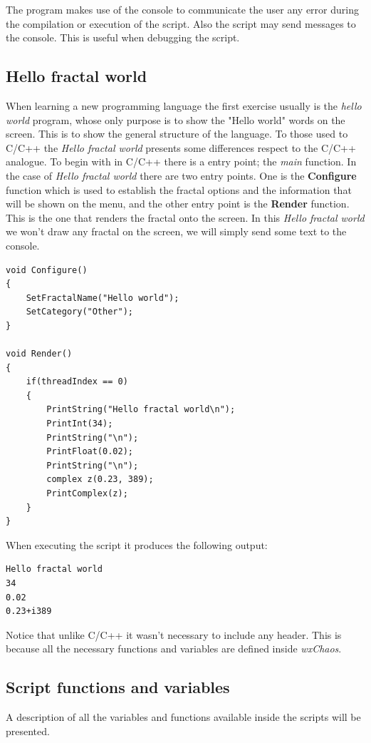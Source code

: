 \documentclass[oneside]{book}
\begin{document}
The program makes use of the console to communicate the user any error during the compilation or execution of the script. Also the script may send messages to the console. This is useful when debugging the script.

\subsection{Hello fractal world}
When learning a new programming language the first exercise usually is the \textit{hello world} program, whose only purpose is to show the "Hello world" words on the screen. This is to show the general structure of the language. To those used to C/C++ the \textit{Hello fractal world} presents some differences respect to the C/C++ analogue. To begin with in C/C++ there is a entry point; the \textit{main} function. In the case of \textit{Hello fractal world} there are two entry points. One is the \textbf{Configure} function which is used to establish the fractal options and the information that will be shown on the menu, and the other entry point is the \textbf{Render} function. This is the one that renders the fractal onto the screen. In this \textit{Hello fractal world} we won't draw any fractal on the screen, we will simply send some text to the console.

\begin{lstlisting}
void Configure()
{
	SetFractalName("Hello world");
	SetCategory("Other");
}

void Render()
{
	if(threadIndex == 0)
	{
		PrintString("Hello fractal world\n");
		PrintInt(34);
		PrintString("\n");
		PrintFloat(0.02);
		PrintString("\n");
		complex z(0.23, 389);
		PrintComplex(z);
	}
}
\end{lstlisting}

When executing the script it produces the following output:
\begin{lstlisting}
Hello fractal world
34
0.02
0.23+i389
\end{lstlisting}

Notice that unlike C/C++ it wasn't necessary to include any header. This is because all the necessary functions and variables are defined inside \textit{wxChaos}.

\subsection{Script functions and variables}
A description of all the variables and functions available inside the scripts will be presented.
\end{document}
